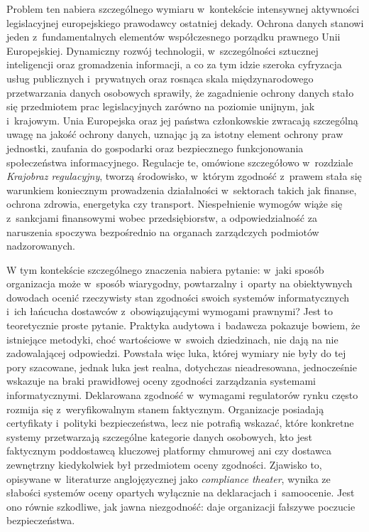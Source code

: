 Problem ten nabiera szczególnego wymiaru w~kontekście intensywnej aktywności legislacyjnej europejskiego prawodawcy ostatniej dekady. Ochrona danych stanowi jeden z~fundamentalnych elementów współczesnego porządku prawnego Unii Europejskiej. Dynamiczny rozwój technologii, w~szczególności sztucznej inteligencji oraz gromadzenia  informacji, a co za tym idzie szeroka cyfryzacja usług publicznych i~prywatnych oraz rosnąca skala międzynarodowego przetwarzania danych osobowych sprawiły, że zagadnienie ochrony danych stało się przedmiotem prac legislacyjnych zarówno na poziomie unijnym, jak i~krajowym. Unia Europejska oraz jej państwa członkowskie zwracają szczególną uwagę na jakość ochrony danych, uznając ją za istotny element ochrony praw jednostki, zaufania do gospodarki oraz bezpiecznego funkcjonowania społeczeństwa informacyjnego. Regulacje te, omówione szczegółowo w~rozdziale \textit{Krajobraz regulacyjny}, tworzą środowisko, w~którym zgodność z~prawem stała się warunkiem koniecznym prowadzenia działalności w~sektorach takich jak finanse, ochrona zdrowia, energetyka czy transport. Niespełnienie wymogów wiąże się z~sankcjami finansowymi wobec przedsiębiorstw, a odpowiedzialność za naruszenia spoczywa bezpośrednio na organach zarządczych podmiotów nadzorowanych.

W tym kontekście szczególnego znaczenia nabiera pytanie: w~jaki sposób organizacja może w~sposób wiarygodny, powtarzalny i~oparty na obiektywnych dowodach ocenić rzeczywisty stan zgodności swoich systemów informatycznych i~ich łańcucha dostawców z~obowiązującymi wymogami prawnymi? Jest to teoretycznie proste pytanie. Praktyka audytowa i~badawcza pokazuje bowiem, że istniejące metodyki, choć wartościowe w~swoich dziedzinach, nie dają na nie zadowalającej odpowiedzi. Powstała więc luka, której wymiary nie były do tej pory szacowane, jednak luka jest realna, dotychczas nieadresowana, jednocześnie wskazuje na braki prawidłowej oceny zgodności zarządzania systemami informatycznymi.
Deklarowana zgodność w~wymagami regulatorów rynku często rozmija się z~weryfikowalnym stanem faktycznym. Organizacje posiadają certyfikaty i~polityki bezpieczeństwa, lecz nie potrafią wskazać, które konkretne systemy przetwarzają szczególne kategorie danych osobowych, kto jest faktycznym poddostawcą kluczowej platformy chmurowej ani czy dostawca zewnętrzny kiedykolwiek był przedmiotem oceny zgodności. Zjawisko to, opisywane w~literaturze anglojęzycznej jako \textit{compliance theater}, wynika ze słabości systemów oceny opartych wyłącznie na deklaracjach i~samoocenie. Jest ono równie szkodliwe, jak jawna niezgodność: daje organizacji fałszywe poczucie bezpieczeństwa.

